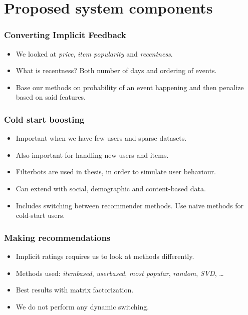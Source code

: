 \documentclass{beamer}
\begin{document}
  \section{Proposed system components}

  \begin{frame}
    \frametitle{Converting Implicit Feedback}
    \begin{itemize}
      \item We looked at \textit{price}, \textit{item popularity} and
      \textit{recentness}.
      \item What is recentness? Both number of days and ordering of events.
      \item Base our methods on probability of an event happening and then
      penalize based on said features.
    \end{itemize}
  \end{frame}

  \begin{frame}
    \frametitle{Cold start boosting}
    \begin{itemize}
      \item Important when we have few users and sparse datasets.
      \item Also important for handling new users and items.
      \item Filterbots are used in thesis, in order to simulate user behaviour.
      \item Can extend with social, demographic and content-based data.
      \item Includes switching between recommender methods. Use naive methods
      for cold-start users.
    \end{itemize}
  \end{frame}

  \begin{frame}
    \frametitle{Making recommendations}
    \begin{itemize}
      \item Implicit ratings requires us to look at methods differently.
      \item Methods used: \textit{itembased}, \textit{userbased}, \textit{most
      popular}, \textit{random}, \textit{SVD}, \dots
      \item Best results with matrix factorization.
      \item We do not perform any dynamic switching.
    \end{itemize}
  \end{frame}
\end{document}
